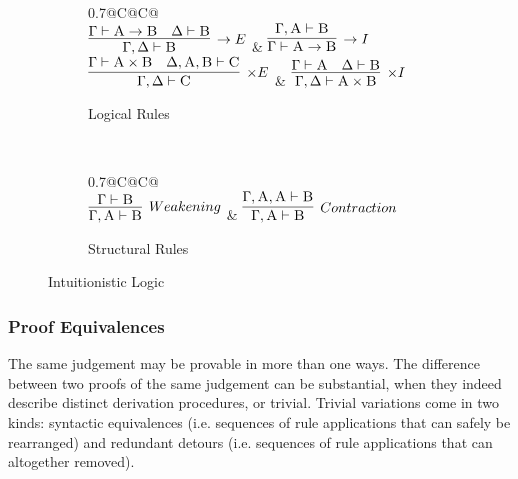 \begin{figure}
	\centering
	\begin{subfigure}{1\textwidth}
		\centering
		\begin{tabularx}{0.7\textwidth}{@{}C@{\qquad}C@{}}
		\\[1em]
		$\infer[\to E]{\Gamma, \Delta \vdash \prop B}{\Gamma \vdash \prop A \to \prop B & \Delta \vdash \prop B}$ 
		& 
		$\infer[\to I]{\Gamma \vdash \prop A \to \prop B}{\Gamma, \prop A \vdash \prop B}$\\[1em]
		$\infer[\times E]{\Gamma,\Delta \vdash \prop C}{\Gamma \vdash \prop A \times \prop B & \Delta, \prop A , \prop B \vdash \prop C}$ 
		&
		$\infer[\times I]{\Gamma, \Delta \vdash \prop A \times \prop B}{\Gamma \vdash \prop A & \Delta \vdash \prop B}$
		\end{tabularx}
		\caption{Logical Rules}
		\label{subfigure:intuitionistic_logic_rules:logical}
	\end{subfigure}\\[2em]
	\begin{subfigure}{1\textwidth}
		\centering
		\begin{tabularx}{0.7\textwidth}{@{}C@{\qquad}C@{}}
		\\[1em]
		$\infer[\Weakening{}]{\Gamma, \prop A \vdash \prop B}{\Gamma \vdash \prop B} $ 
		&
		$\infer[\Contraction{}]{\Gamma, \prop A \vdash \prop B}{\Gamma, \prop A, \prop A \vdash \prop B}$
		\end{tabularx}
		\caption{Structural Rules}
		\label{subfigure:intuitionistic_logic_rules:structural}
	\end{subfigure}
	\caption{Intuitionistic Logic}
	\label{figure:intuitioistic_logic_rules}
\end{figure}

\subsubsection{Proof Equivalences}
The same judgement may be provable in more than one ways.
The difference between two proofs of the same judgement can be substantial, when they indeed describe distinct derivation procedures, or trivial.
Trivial variations come in two kinds: syntactic equivalences (i.e. sequences of rule applications that can safely be rearranged) and redundant detours (i.e. sequences of rule applications that can altogether removed).

